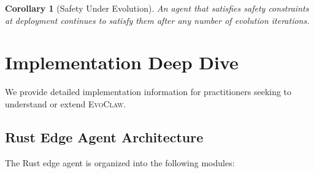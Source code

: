\documentclass{article}
\newtheorem{corollary}{Corollary}
\newcommand{\evoclaw}{\textsc{EvoClaw}}
\begin{document}
\begin{corollary}[Safety Under Evolution]
An agent that satisfies safety constraints at deployment continues to satisfy them after any number of evolution iterations.
\end{corollary}



\section{Implementation Deep Dive}
\label{sec:impl_deep}

We provide detailed implementation information for practitioners seeking to understand or extend \evoclaw{}.

\subsection{Rust Edge Agent Architecture}

The Rust edge agent is organized into the following modules:
\end{document}
